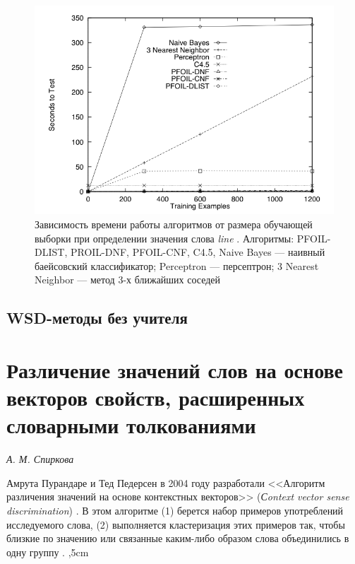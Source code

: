 \documentclass{article}
\begin{document}
\begin{articletext}
\begin{figure}[H]
\includegraphics[keepaspectratio=true,
 width=0.9\columnwidth]{line_wsd_3_testing_time.png}
\caption{Зависимость времени работы алгоритмов от размера обучающей выборки при определении значения слова \textit{line} \cite{Mooney 1996}. Алгоритмы: PFOIL-DLIST, PROIL-DNF, PFOIL-CNF, C4.5, Naive Bayes --- наивный баейсовский классификатор; Perceptron --- персептрон; 3 Nearest Neighbor --- метод 3-х ближайших соседей}
\label{kor3}
\end{figure}

\bfullwidth
\begin{center}
\section{WSD-методы без учителя}
\end{center}
\efullwidth


\section{Различение значений слов на основе векторов свойств, расширенных словарными толкованиями}

\begin{flushright}
\textit{А. М. Спиркова} 
\end{flushright}

Амрута Пурандаре и Тед Педерсен в 2004 году разработали <<Алгоритм различения значений на основе контекстных векторов>> (\textit{Сontext vector sense discrimination}) \cite{Purandare 2004}. В этом алгоритме (1) берется набор примеров употреблений исследуемого слова, (2) выполняется кластеризация этих примеров так, чтобы близкие по значению или связанные каким-либо образом слова объединились в одну группу \cite{Purandare 2004}.
,5cm


\end{articletext}
\end{document}
